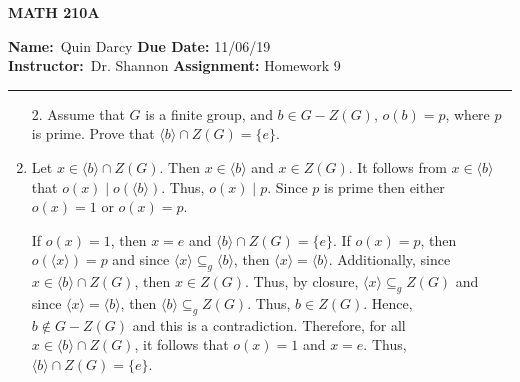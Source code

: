 \documentclass[12pt]{article}
\makeatletter
\theoremstyle{definition}
\theoremstyle{remark}
\renewenvironment{proof}[1][\proofname]{\par
  \pushQED{\qed}%
  \normalfont \topsep6\p@\@plus6\p@\relax
  \list{}{\leftmargin=0mm
          \rightmargin=4mm
          \settowidth{\itemindent}{\itshape#1}%
          \labelwidth=\itemindent
          \parsep=0pt \listparindent=\parindent 
  }
  \item[\hskip\labelsep
        \itshape
    #1\@addpunct{.}]\ignorespaces
}{%
  \popQED\endlist\@endpefalse
}
\let\oldproofname=\proofname
\renewcommand{\proofname}{\bf{\textit{\oldproofname}}}
\makeatother
\begin{document}
\begin{center}
	\vspace{.4cm} {\textbf { \large MATH 210A}}
\end{center}
{\textbf{Name:}\ Quin Darcy \hspace{\fill} \textbf{Due Date:} 11/06/19   \\
{ \textbf{Instructor:}}\ Dr. Shannon \hspace{\fill} \textbf{Assignment:} Homework 9 \\ \hrule}

\justifying

    \begin{enumerate}[leftmargin=*]
        \item[2.] Assume that $G$ is a finite group, and $b\in G-Z(G)$, $o(b)=p$, where $p$ is prime. Prove that $\langle b\rangle\cap Z(G)=\{e\}$.
            \begin{proof}
                Let $x\in\langle b\rangle\cap Z(G)$. Then $x\in \langle b\rangle$ and $x\in Z(G)$. It follows from $x\in\langle b\rangle$ that $o(x)\mid o(\langle b\rangle)$. Thus, $o(x)\mid p$. Since $p$ is prime then either $o(x)=1$ or $o(x)=p$.\par\hspace{4mm} If $o(x)=1$, then $x=e$ and $\langle b\rangle\cap Z(G)=\{e\}$. If $o(x)=p$, then $o(\langle x\rangle)=p$ and since $\langle x\rangle\subseteq_g\langle b\rangle$, then $\langle x\rangle=\langle b\rangle$. Additionally, since $x\in\langle b\rangle\cap Z(G)$, then $x\in Z(G)$. Thus, by closure, $\langle x\rangle\subseteq_g Z(G)$ and since $\langle x\rangle =\langle b\rangle$, then $\langle b\rangle\subseteq_g Z(G)$. Thus, $b\in Z(G)$. Hence, $b\notin G-Z(G)$ and this is a contradiction. Therefore, for all $x\in\langle b\rangle\cap Z(G)$, it follows that $o(x)=1$ and $x=e$. Thus, $\langle b\rangle\cap Z(G)=\{e\}$.
            \end{proof}
            

\end{enumerate}
\end{document}
